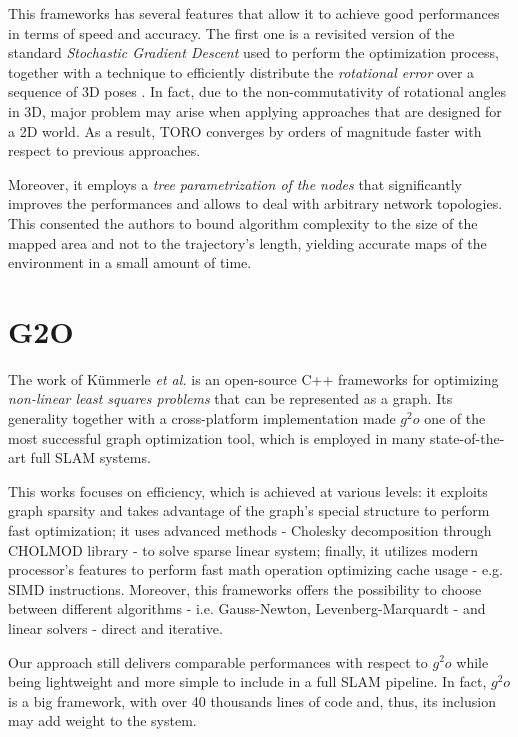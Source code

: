 This frameworks has several features that allow it to achieve good performances in terms of speed and accuracy. The first one is a revisited version of the standard \textit{Stochastic Gradient Descent} used to perform the optimization process, together with a technique to efficiently distribute the \textit{rotational error} over a sequence of 3D poses \cite{grisetti2007efficient}. In fact, due to the non-commutativity of rotational angles in 3D, major problem may arise when applying approaches that are designed for a 2D world. As a result, TORO converges by orders of magnitude faster with respect to previous approaches.

Moreover, it employs a \textit{tree parametrization of the nodes} \cite{grisetti2007tree} that significantly improves the performances and allows to deal with arbitrary network topologies. This consented the authors to bound algorithm complexity to the size of the mapped area and not to the trajectory's length, yielding accurate maps of the environment in a small amount of time.

\section{G2O}\label{sec:g2o}
The work of K\"ummerle \textit{et al.} \cite{kummerle2011g} is an open-source C++ frameworks for optimizing \textit{non-linear least squares problems} that can be represented as a graph. Its generality together with a cross-platform implementation made $g^2o$ one of the most successful graph optimization tool, which is employed in many state-of-the-art full SLAM systems. 

This works focuses on efficiency, which is achieved at various levels: it exploits graph sparsity and takes advantage of the graph's special structure to perform fast optimization; it uses advanced methods - Cholesky decomposition through CHOLMOD library - to solve sparse linear system; finally, it utilizes modern processor's features to perform fast math operation optimizing cache usage - e.g. SIMD instructions. Moreover, this frameworks offers the possibility to choose between different algorithms - i.e. Gauss-Newton, Levenberg-Marquardt - and linear solvers - direct and iterative.

Our approach still delivers comparable performances with respect to $g^2o$ while being lightweight and more simple to include in a full SLAM pipeline. In fact, $g^2o$ is a big framework, with over 40 thousands lines of code and, thus, its inclusion may add weight to the system.


